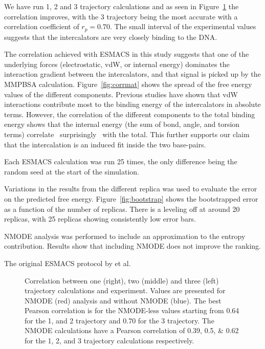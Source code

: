 \documentclass{article}
\begin{document}

We have run 1, 2 and 3 trajectory calculations and as seen in Figure~\ref{fig:mmpbsa} the correlation improves, with the 3 trajectory being the most accurate with a correlation coefficient of $r_p=0.70$. The small interval of the experimental values suggests that the intercalators are very closely binding to the DNA. 


The correlation achieved with ESMACS in this study suggests that one of the underlying forces (electrostatic, vdW, or internal energy) dominates the interaction gradient between the intercalators, and that signal is picked up by the MMPBSA calculation. Figure~\ref{fig:corrmat} shows the spread of the free energy values of the different components. Previous studies \cite{} have shown that vdW interactions contribute most to the binding energy of the intercalators in absolute terms. However, the correlation of the different components to the total binding energy shows that the internal energy (the sum of bond, angle, and torsion terms) correlate ~surprisingly~ with the total. 
This further supports our claim that the intercalation is an induced fit inside the two base-pairs.

Each ESMACS calculation was run 25 times, the only difference being the random seed at the start of the simulation. 

Variations in the results from the different replica was used to evaluate the error on the predicted free energy. Figure~\ref{fig:bootstrap} shows the bootstrapped error as a function of the number of replicas. There is a leveling off at around 20 replicas, with 25 replicas showing consistently low error bars.

NMODE analysis was performed to include an approximation to the entropy contribution. Results show that including NMODE does not improve the ranking. 


The original ESMACS protocol by \cite{} et al. 

\begin{figure}
	
	\caption{Correlation between one (right), two (middle) and three (left) trajectory calculations and experiment. Values are presented for NMODE (red) analysis and without NMODE (blue). The best Pearson correlation is for the NMODE-less values starting from \num{0.64} for the 1, and 2 trajectory and \num{0.70} for the 3 trajectory. The NMODE calculations have a Pearson correlation of \numlist{0.39; 0.5; 0.62} for the 1, 2, and 3 trajectory calculations respectively.}
	\label{fig:mmpbsa}
\end{figure}
\end{document}
